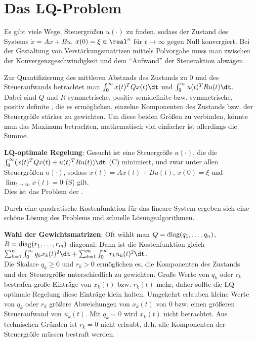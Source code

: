 \pagebreak

\section{%
    Das LQ-Problem%
}

Es gibt viele Wege, Steuergrößen $u(\cdot)$ zu finden, sodass der Zustand des Systems
$\dot{x} = Ax + Bu$, $x(0) = \xi \in \real^n$ für $t \to \infty$ gegen Null konvergiert.
Bei der Gestaltung von Verstärkungsmatrizen mittels Polvorgabe muss man zwischen der
Konvergenzgeschwindigkeit und dem "`Aufwand"' der Steueraktion abwägen.

Zur Quantifizierung des mittleren Abstands des Zustands zu $0$ und des Steueraufwands
betrachtet man $\int_0^\infty x(t)^T Qx(t)\dt$ und $\int_0^\infty u(t)^T Ru(t)\dt$.
Dabei sind $Q$ und $R$ symmetrische, positiv semidefinite bzw. symmetrische, positiv definite
, die es ermöglichen, einzelne Komponenten des Zustands bzw. der
Steuergröße stärker zu gewichten.
Um diese beiden Größen zu verbinden, könnte man das Maximum betrachten, mathematisch
viel einfacher ist allerdings die Summe.

\textbf{LQ-optimale Regelung}:
Gesucht ist eine Steuergröße $u(\cdot)$, die die \\
$\int_0^\infty (x(t)^T Qx(t) + u(t)^T Ru(t))\dt$ (C) minimiert,
und zwar unter allen Steuergrößen $u(\cdot)$, sodass
$\dot{x}(t) = Ax(t) + Bu(t)$, $x(0) = \xi$ und $\lim_{t \to \infty} x(t) = 0$ (S) gilt.\\
Dies ist das Problem der
.

Durch eine quadratische Kostenfunktion für das lineare System ergeben sich eine schöne Lösung des
Problems und schnelle Lösungsalgorithmen.

\linie

\textbf{Wahl der Gewichtsmatrizen}:
Oft wählt man $Q = \operatorname{diag}(q_1, \dotsc, q_n)$, $R = \operatorname{diag}(r_1, \dotsc, r_m)$ diagonal.
Dann ist die Kostenfunktion gleich
$\sum_{k=1}^n \int_0^\infty q_k x_k(t)^2\dt + \sum_{k=1}^m \int_0^\infty r_k u_k(t)^2\dt$.\\
Die Skalare $q_k \ge 0$ und $r_k > 0$ ermöglichen es, die Komponenten des Zustands und der
Steuergröße unterschiedlich zu gewichten.
Große Werte von $q_k$ oder $r_k$ bestrafen große Einträge von $x_k(t)$ bzw. $r_k(t)$ mehr,
daher sollte die LQ-optimale Regelung diese Einträge klein halten.
Umgekehrt erlauben kleine Werte von $q_k$ oder $r_k$ größere Abweichungen von $x_k(t)$ von $0$
bzw. einen größeren Steueraufwand von $u_k(t)$.
Mit $q_k = 0$ wird $x_k(t)$ nicht betrachtet.
Aus technischen Gründen ist $r_k = 0$ nicht erlaubt, d.\,h. alle Komponenten der Steuergröße
müssen bestraft werden.

